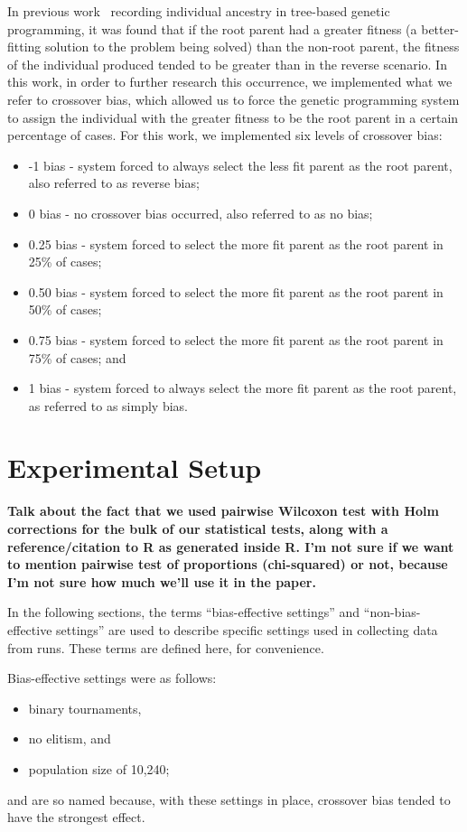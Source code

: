 \documentclass{sig-alternate}
\begin{document}
In previous work~\cite{McPheeDonatucciDramdahl:2014} recording individual ancestry in tree-based genetic programming,
it was found that if the root parent had a greater fitness (a better-fitting solution to the problem being solved) than
the non-root parent, the fitness of the individual produced tended to be greater than in the reverse scenario. In this
work, in order to further research this occurrence, we implemented what we refer to crossover bias, which allowed us to
force the genetic programming system to assign the individual with the greater fitness to be the root parent in a
certain percentage of cases. For this work, we implemented six levels of crossover bias:
\begin{itemize}
\item -1 bias - system forced to always select the less fit parent as the root parent, also referred to as reverse bias;
\item 0 bias - no crossover bias occurred, also referred to as no bias;
\item 0.25 bias - system forced to select the more fit parent as the root parent in 25\% of cases;
\item 0.50 bias - system forced to select the more fit parent as the root parent in 50\% of cases;
\item 0.75 bias - system forced to select the more fit parent as the root parent in 75\% of cases; and
\item 1 bias - system forced to always select the more fit parent as the root parent, as referred to as simply bias.
\end{itemize}

\section{Experimental Setup} \label{sec:Experiments}

\textbf{Talk about the fact that we used pairwise Wilcoxon test with Holm corrections for the bulk of our statistical 
tests, along with a reference/citation to R as generated inside R. I'm not sure if we want to mention pairwise test of 
proportions (chi-squared) or not, because I'm not sure how much we'll use it in the paper.}

In the following sections, the terms ``bias-effective settings'' and ``non-bias-effective settings'' are used to
describe specific settings used in collecting data from runs. These terms are defined here, for convenience.

Bias-effective settings were as follows:
\begin{itemize}
\item binary tournaments,
\item no elitism, and
\item population size of 10,240;
\end{itemize}
and are so named because, with these settings in place, crossover bias tended to have the strongest effect.
\end{document}
